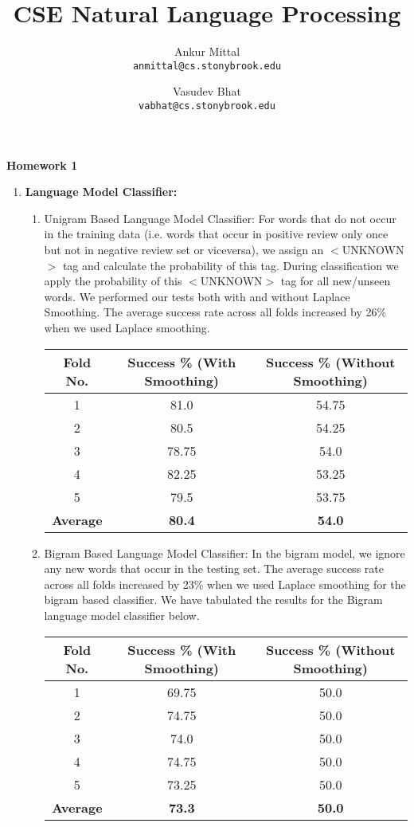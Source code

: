 \documentclass[11pt,a4paper]{article}
\begin{document}
	\title{CSE Natural Language Processing}
	\author{Ankur Mittal\\ \texttt{anmittal@cs.stonybrook.edu}\and Vasudev Bhat\\\texttt{vabhat@cs.stonybrook.edu} }
	\maketitle
	\begin{flushleft}
		{\Large \textbf{Homework 1}}
	\end{flushleft}
	\begin{enumerate}
		\item
		{\bf Language Model Classifier:}
		\begin{enumerate}
			\item Unigram Based Language Model Classifier: For words that do not occur in the training data (i.e. words that occur in positive review only once but not in negative review set or viceversa), we assign an $<$UNKNOWN$>$ tag and calculate the probability of this tag. During classification we apply the probability of this $<$UNKNOWN$>$ tag for all new/unseen words. We performed our tests both with and without Laplace Smoothing. The average success rate across all folds increased by 26\% when we used Laplace smoothing.
			\begin{center}
				\begin{tabular}{|c|c|c|}
				\hline
				{\bf Fold No.} & {\bf Success \% (With Smoothing)} & {\bf Success \% (Without Smoothing)} \\\hline
				1 &	81.0	& 54.75 \\\hline
				2	& 80.5	& 54.25\\\hline
				3 & 78.75	& 54.0\\\hline
				4	& 82.25 &	53.25\\\hline
				5 &	79.5 &	53.75\\\hline
				{\bf Average } &	{\bf 80.4} &	{\bf 54.0}\\\hline

				\end{tabular} 
			\end{center}
			\item Bigram Based Language Model Classifier: In the bigram model, we ignore any new words that occur in the testing set. The average success rate across all folds increased by 23\% when we used Laplace smoothing for the bigram based classifier. We have tabulated the results for the Bigram language model classifier below.
			\begin{center}
				\begin{tabular}{|c|c|c|}
				\hline
				{\bf Fold No.} & {\bf Success \% (With Smoothing)} & {\bf Success \% (Without Smoothing)} \\\hline
				1 &	69.75	& 50.0 \\\hline
				2	& 74.75	& 50.0\\\hline
				3 & 74.0	& 50.0\\\hline
				4	& 74.75 &	50.0\\\hline
				5 &	73.25 &	50.0\\\hline
				{\bf Average } &	{\bf 73.3} &	{\bf 50.0}\\\hline


\end{tabular}
\end{center}
\end{enumerate}
\end{enumerate}
\end{document}
